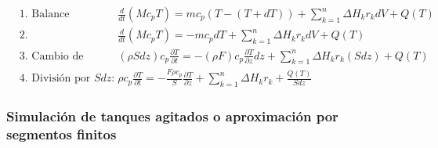 \begin{equation*}
    \begin{alignedat}{2}
         & \text{1. Balance inicial:} \quad     &  & \frac{d}{dt}(M c_p T) = m c_p (T - (T + dT)) + \sum_{k=1}^{n} \Delta H_k r_k dV + Q(T)                                                                                        \\[10pt]
         & \text{2. Simplificación:} \quad      &  & \frac{d}{dt}(M c_p T) = -m c_p dT + \sum_{k=1}^{n} \Delta H_k r_k dV + Q(T)                                                                                                   \\[10pt]
         & \text{3. Cambio de variables:} \quad &  & \left(\rho S dz\right) c_p \frac{\partial T}{\partial t} = -\left(\rho F\right) c_p \frac{\partial T}{\partial z} dz + \sum_{k=1}^{n} \Delta H_k r_k \left(S dz\right) + Q(T) \\[10pt]
         & \text{4. División por } S dz: \quad  &  & \rho c_p \frac{\partial T}{\partial t} = -\frac{F \rho c_p}{S} \frac{\partial T}{\partial z} + \sum_{k=1}^{n} \Delta H_k r_k + \frac{Q(T)}{S dz}
    \end{alignedat}
\end{equation*}

\vspace{1em}
\subsubsection{Simulación de tanques agitados o aproximación por segmentos finitos}
\vspace{1em}

